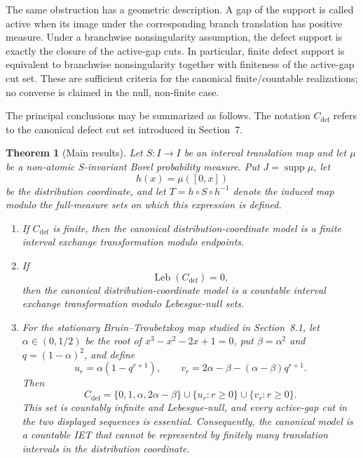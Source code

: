 \documentclass[11pt]{amsart}
\theoremstyle{plain}
\newtheorem{theorem}{Theorem}[section]
\theoremstyle{definition}
\theoremstyle{remark}
\DeclareMathOperator{\supp}{supp}
\DeclareMathOperator{\Leb}{Leb}
\begin{document}
The same obstruction has a geometric description. A gap of the support is called active when
its image under the corresponding branch translation has positive measure. Under a
branchwise nonsingularity assumption, the defect support is exactly the closure of the active-gap
cuts. In particular, finite defect support is equivalent to branchwise nonsingularity together
with finiteness of the active-gap cut set. These are sufficient criteria for the canonical
finite/countable realizations; no converse is claimed in the null, non-finite case.

The principal conclusions may be summarized as follows. The notation
\(C_{\mathrm{def}}\) refers to the canonical defect cut set introduced in
Section~7.

\begin{theorem}[Main results]
\label{thm:introduction-main-results}
Let \(S:I\to I\) be an interval translation map and let \(\mu\) be a
non-atomic \(S\)-invariant Borel probability measure. Put
\(J=\supp\mu\), let
\[
        h(x)=\mu([0,x])
\]
be the distribution coordinate, and let \(T=h\circ S\circ h^{-1}\) denote
the induced map modulo the full-measure sets on which this expression is
defined.
\begin{enumerate}[label=\textup{(\roman*)}]
\item If \(C_{\mathrm{def}}\) is finite, then the canonical
      distribution-coordinate model is a finite interval exchange
      transformation modulo endpoints.
\item If
      \[
              \Leb(C_{\mathrm{def}})=0,
      \]
      then the canonical distribution-coordinate model is a countable
      interval exchange transformation modulo Lebesgue-null sets.
\item For the stationary Bruin--Troubetzkoy map studied in
      Section~8.1, let \(\alpha\in(0,1/2)\) be the root of
      \(x^3-x^2-2x+1=0\), put \(\beta=\alpha^2\) and
      \(q=(1-\alpha)^2\), and define
      \[
              u_r=\alpha(1-q^{r+1}),
              \qquad
              v_r=2\alpha-\beta-(\alpha-\beta)q^{r+1}.
      \]
      Then
      \[
              C_{\mathrm{def}}
              =
              \{0,1,\alpha,2\alpha-\beta\}
              \cup\{u_r:r\geq0\}
              \cup\{v_r:r\geq0\}.
      \]
      This set is countably infinite and Lebesgue-null, and every
      active-gap cut in the two displayed sequences is essential.
      Consequently, the canonical model is a countable IET that cannot
      be represented by finitely many translation intervals in the
      distribution coordinate.
\end{enumerate}
\end{theorem}
\end{document}
